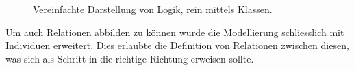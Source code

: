 \begin{figure}[H]
\centering {}
\caption{Vereinfachte Darstellung von Logik, rein mittels Klassen.\label{fig:prolog_logik_baum}\protect\footnotemark}
\end{figure}

Um auch Relationen abbilden zu können wurde die Modellierung schliesslich mit Individuen erweitert. Dies erlaubte die Definition von Relationen zwischen diesen, was sich als Schritt in die richtige Richtung erweisen sollte.


